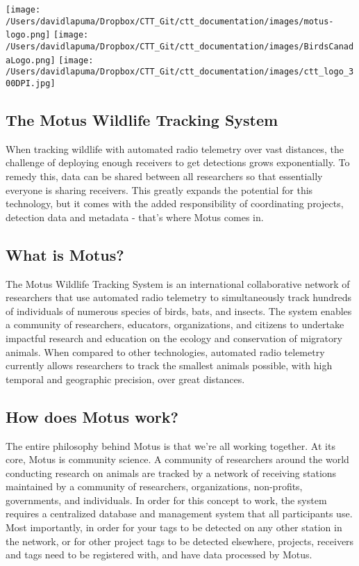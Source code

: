 \documentclass[
]{article}
\begin{document}
\texttt{[image: /Users/davidlapuma/Dropbox/CTT\_Git/ctt\_documentation/images/motus-logo.png]}
\texttt{[image: /Users/davidlapuma/Dropbox/CTT\_Git/ctt\_documentation/images/BirdsCanadaLogo.png]}
\texttt{[image: /Users/davidlapuma/Dropbox/CTT\_Git/ctt\_documentation/images/ctt\_logo\_300DPI.jpg]}

\hypertarget{the-motus-wildlife-tracking-system}{%
\subsection{The Motus Wildlife Tracking
System}\label{the-motus-wildlife-tracking-system}}

When tracking wildlife with automated radio telemetry over vast
distances, the challenge of deploying enough receivers to get detections
grows exponentially. To remedy this, data can be shared between all
researchers so that essentially everyone is sharing receivers. This
greatly expands the potential for this technology, but it comes with the
added responsibility of coordinating projects, detection data and
metadata - that's where Motus comes in.

\hypertarget{what-is-motus}{%
\subsection{What is Motus?}\label{what-is-motus}}

The Motus Wildlife Tracking System is an international collaborative
network of researchers that use automated radio telemetry to
simultaneously track hundreds of individuals of numerous species of
birds, bats, and insects. The system enables a community of researchers,
educators, organizations, and citizens to undertake impactful research
and education on the ecology and conservation of migratory animals. When
compared to other technologies, automated radio telemetry currently
allows researchers to track the smallest animals possible, with high
temporal and geographic precision, over great distances.

\hypertarget{how-does-motus-work}{%
\subsection{How does Motus work?}\label{how-does-motus-work}}

The entire philosophy behind Motus is that we're all working together.
At its core, Motus is community science. A community of researchers
around the world conducting research on animals are tracked by a network
of receiving stations maintained by a community of researchers,
organizations, non-profits, governments, and individuals. In order for
this concept to work, the system requires a centralized database and
management system that all participants use. Most importantly, in order
for your tags to be detected on any other station in the network, or for
other project tags to be detected elsewhere, projects, receivers and
tags need to be registered with, and have data processed by Motus.
\end{document}
